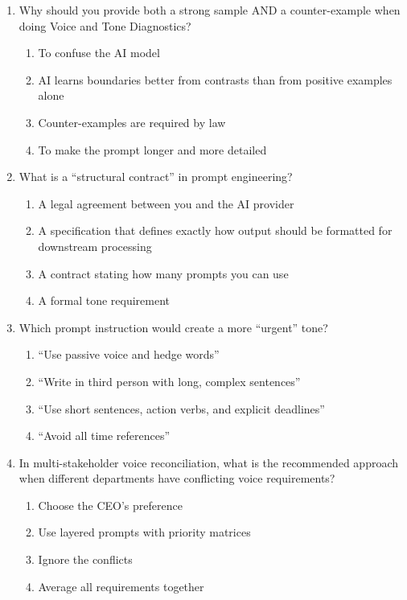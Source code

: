 \documentclass[11pt]{article}
\begin{document}
\begin{enumerate}
\item Why should you provide both a strong sample AND a counter-example when doing Voice and Tone Diagnostics?
\begin{enumerate}[label=\Alph*.]
    \item To confuse the AI model
    \item AI learns boundaries better from contrasts than from positive examples alone
    \item Counter-examples are required by law
    \item To make the prompt longer and more detailed
\end{enumerate}

\item What is a ``structural contract'' in prompt engineering?
\begin{enumerate}[label=\Alph*.]
    \item A legal agreement between you and the AI provider
    \item A specification that defines exactly how output should be formatted for downstream processing
    \item A contract stating how many prompts you can use
    \item A formal tone requirement
\end{enumerate}

\item Which prompt instruction would create a more ``urgent'' tone?
\begin{enumerate}[label=\Alph*.]
    \item ``Use passive voice and hedge words''
    \item ``Write in third person with long, complex sentences''
    \item ``Use short sentences, action verbs, and explicit deadlines''
    \item ``Avoid all time references''
\end{enumerate}

\item In multi-stakeholder voice reconciliation, what is the recommended approach when different departments have conflicting voice requirements?
\begin{enumerate}[label=\Alph*.]
    \item Choose the CEO's preference
    \item Use layered prompts with priority matrices
    \item Ignore the conflicts
    \item Average all requirements together
\end{enumerate}


\end{enumerate}
\end{document}
